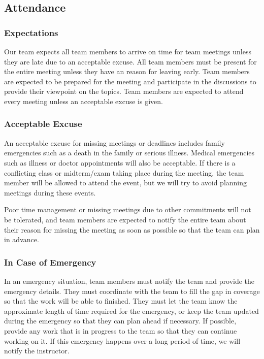 \documentclass{article}
\begin{document}
\subsection*{Attendance}

\subsubsection*{Expectations}

Our team expects all team members to arrive on time for team meetings unless they are late due to an acceptable excuse. All team members must be present for the entire meeting unless they have an reason for leaving early. 
Team members are expected to be prepared for the meeting and participate in the discussions to provide their viewpoint on the topics. Team members are expected to attend every meeting unless an acceptable excuse is given.

\subsubsection*{Acceptable Excuse}

An acceptable excuse for missing meetings or deadlines includes family emergencies such as a death in the family or serious illness. Medical emergencies such as illness or doctor appointments will also be acceptable. 
If there is a conflicting class or midterm/exam taking place during the meeting, the team member will be allowed to attend the event, but we will try to avoid planning meetings during these events. 

Poor time management or missing meetings due to other commitments will not be tolerated, and team members are expected to notify the entire team about their reason for missing the meeting as soon as possible so that the team can plan in advance.

\subsubsection*{In Case of Emergency}

In an emergency situation, team members must notify the team and provide the emergency details. They must coordinate with the team to fill the gap in coverage so that the work will be able to finished.
They must let the team know the approximate length of time required for the emergency, or keep the team updated during the emergency so that they can plan ahead if necessary. If possible, provide any work 
that is in progress to the team so that they can continue working on it. If this emergency happens over a long period of time, we will notify the instructor.
\end{document}
